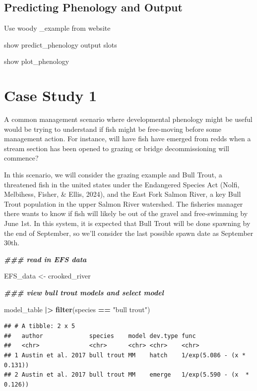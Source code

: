 \documentclass[10pt,a4paper,onecolumn]{article}
\newenvironment{Shaded}{\begin{snugshade}}{\end{snugshade}}
\newcommand{\DocumentationTok}[1]{\textcolor[rgb]{0.56,0.35,0.01}{\textbf{\textit{#1}}}}
\newcommand{\FunctionTok}[1]{\textcolor[rgb]{0.13,0.29,0.53}{\textbf{#1}}}
\newcommand{\NormalTok}[1]{#1}
\newcommand{\OtherTok}[1]{\textcolor[rgb]{0.56,0.35,0.01}{#1}}
\newcommand{\SpecialCharTok}[1]{\textcolor[rgb]{0.81,0.36,0.00}{\textbf{#1}}}
\newcommand{\StringTok}[1]{\textcolor[rgb]{0.31,0.60,0.02}{#1}}
\begin{document}
\subsection{Predicting Phenology and
Output}\label{predicting-phenology-and-output}

Use woody \_example from website

show predict\_phenology output slots

show plot\_phenology

\section{Case Study 1}\label{case-study-1}

A common management scenario where developmental phenology might be
useful would be trying to understand if fish might be free-moving before
some management action. For instance, will have fish have emerged from
redds when a stream section has been opened to grazing or bridge
decommissioning will commence?

In this scenario, we will consider the grazing example and Bull Trout, a
threatened fish in the united states under the Endangered Species Act
(Nolfi, Melbihess, Fisher, \& Ellis, 2024), and the East Fork Salmon
River, a key Bull Trout population in the upper Salmon River watershed.
The fisheries manager there wants to know if fish will likely be out of
the gravel and free-swimming by June 1st. In this system, it is expected
that Bull Trout will be done spawning by the end of September, so we'll
consider the last possible spawn date as September 30th.

\begin{Shaded}
\begin{Highlighting}[]
\DocumentationTok{\#\#\# read in EFS data}

\NormalTok{EFS\_data }\OtherTok{\textless{}{-}}\NormalTok{ crooked\_river}

\DocumentationTok{\#\#\# view bull trout models and select model}

\NormalTok{model\_table }\SpecialCharTok{|\textgreater{}} 
  \FunctionTok{filter}\NormalTok{(species }\SpecialCharTok{==} \StringTok{"bull trout"}\NormalTok{)}
\end{Highlighting}
\end{Shaded}

\begin{verbatim}
## # A tibble: 2 x 5
##   author             species    model dev.type func                       
##   <chr>              <chr>      <chr> <chr>    <chr>                      
## 1 Austin et al. 2017 bull trout MM    hatch    1/exp(5.086 - (x * 0.131)) 
## 2 Austin et al. 2017 bull trout MM    emerge   1/exp(5.590 - (x  * 0.126))
\end{verbatim}
\end{document}
